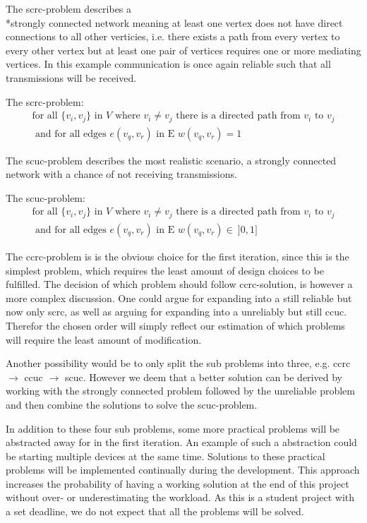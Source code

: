 \noindent The \gls{scrc}-problem describes a \\*strongly connected network meaning at least one vertex does not have direct connections to all other verticies, i.e. there exists a path from every vertex to every other vertex but at least one pair of vertices requires one or more mediating vertices. 
In this example communication is once again reliable such that all transmissions will be received. 

\begin{definition}
	The \acrshort{scrc}-problem:
	\begin{align*}
		\text{for all } \{v_i, v_j\} \text{ in } V \text{ where } v_i \neq v_j \text{ there is a directed path from } v_i \text{ to } v_j\\
		\text{ and for all edges } e(v_{q}, v_{r}) \text{ in E } w(v_{q}, v_{r}) = 1
	\end{align*}
\end{definition}

\noindent The \gls{scuc}-problem describes the most realistic scenario, a strongly connected network with a chance of not receiving transmissions. 

\begin{definition}\label{SCUC}
	The \acrshort{scuc}-problem:
	\begin{align*}
		\text{for all } \{v_i, v_j\} \text{ in } V \text{ where } v_i \neq v_j \text{ there is a directed path from } v_i \text{ to } v_j\\
		\text{ and for all edges } e(v_{q}, v_{r}) \text{ in E } w(v_{q}, v_{r}) \in\ ]0,1]
	\end{align*}
\end{definition}

\bigskip 
\noindent
The \gls{ccrc}-problem is is the obvious choice for the first iteration, since this is the simplest problem, which requires the least amount of design choices to be fulfilled.
The decision of which problem should follow \gls{ccrc}-solution, is however a more complex discussion.
One could argue for expanding into a still reliable but now only \acrlong{scrc}, as well as arguing for expanding into a unreliably but still \acrlong{ccuc}.
Therefor the chosen order will simply reflect our estimation of which problems will require the least amount of modification.

Another possibility would be to only split the sub problems into three, e.g. \gls{ccrc} $\rightarrow$ \gls{ccuc} $\rightarrow$ \gls{scuc}.
However we deem that a better solution can be derived by working with the strongly connected problem followed by the unreliable problem and then combine the solutions to solve the \gls{scuc}-problem.

In addition to these four sub problems, some more practical problems will be abstracted away for in the first iteration.
An example of such a abstraction could be starting multiple devices at the same time.
Solutions to these practical problems will be implemented continually during the development. 
This approach increases the probability of having a working solution at the end of this project without over- or underestimating the workload. 
As this is a student project with a set deadline, we do not expect that all the problems will be solved.

